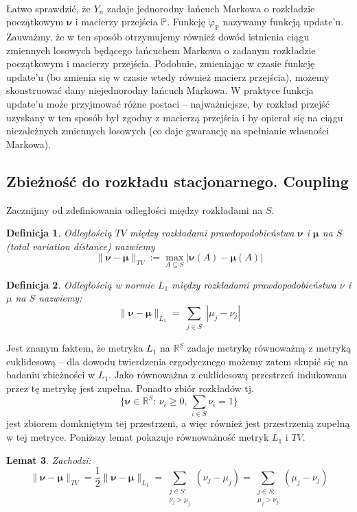 \documentclass[a4paper]{article}
\theoremstyle{defn}
\newtheorem{defn}{Definicja}[subsection]
\theoremstyle{theorem}
\theoremstyle{lemma}
\newtheorem{lemma}[defn]{Lemat}
\theoremstyle{cor}
\theoremstyle{fact}
\begin{document}
\\
Łatwo sprawdzić, że $Y_n$ zadaje jednorodny łańcuch Markowa o rozkładzie początkowym $\boldsymbol{\nu}$ i macierzy przejścia $\mathbb{P}$. Funkcję $\varphi_{\mathbb{P}}$ nazywamy funkcją update'u. Zauważmy, że w ten sposób otrzymujemy również dowód istnienia ciągu zmiennych losowych będącego łańcuchem Markowa o zadanym rozkładzie początkowym i macierzy przejścia.
Podobnie, zmieniając w czasie funkcję update'u (bo zmienia się w czasie wtedy również macierz przejścia), możemy skonstruować dany niejednorodny łańcuch Markowa. W praktyce funkcja update'u może przyjmować różne postaci – najważniejsze, by rozkład przejść uzyskany w ten sposób był zgodny z macierzą przejścia i by opierał się na ciągu niezależnych zmiennych losowych (co daje gwarancję na spełnianie własności Markowa).
\subsection{Zbieżność do rozkładu stacjonarnego. Coupling}
\label{sect2.4}
Zacznijmy od zdefiniowania odległości między rozkładami na $S$.
\begin{defn}\label{defn2.4.1}
Odległością $TV$ między rozkładami prawdopodobieństwa $\boldsymbol{\nu}$ i $\boldsymbol{\mu}$ na $S$ (\textit{total variation distance}) nazwiemy $$\|\boldsymbol{\nu} - \boldsymbol{\mu}\|_{TV} := \max\limits_{A \subseteq S} |\boldsymbol{\nu}(A) - \boldsymbol{\mu}(A)|$$
\end{defn}
\begin{defn}\label{defn2.4.2}
Odległością w normie $L_1$ między rozkładami prawdopodobieństwa $\nu$ i $\mu$ na $S$ nazwiemy:
$$\|\boldsymbol{\nu} - \boldsymbol{\mu}\|_{L_1} = \sum\limits_{\substack{j \in S}} |\mu_j - \nu_j|$$
\end{defn}
Jest znanym faktem, że metryka $L_1$ na $\mathbb{R}^S$ zadaje metrykę równoważną z metryką euklidesową – dla dowodu twierdzenia ergodycznego możemy zatem skupić się na badaniu zbieżności w $L_1$. Jako równoważna z euklidesową przestrzeń indukowana przez tę metrykę jest zupełna. Ponadto zbiór rozkładów tj.
$$\{\boldsymbol{\nu} \in \mathbb{R}^S:\, \nu_i \geq 0, \, \sum\limits_{i \in S} \nu_i = 1\}$$
jest zbiorem domkniętym tej przestrzeni, a więc również jest przestrzenią zupełną w tej metryce. Poniższy lemat pokazuje równoważność metryk $L_1$ i $TV$.
\begin{lemma}\label{lemma2.4.3}
Zachodzi:
$$\|\boldsymbol{\nu} - \boldsymbol{\mu}\|_{TV} = \frac{1}{2}\|\boldsymbol{\nu} - \boldsymbol{\mu}\|_{L_1} = \sum\limits_{\substack{j \in S:\\ \nu_j > \mu_j}} (\nu_j - \mu_j) = \sum\limits_{\substack{j \in S:\\ \mu_j > \nu_j}} (\mu_j - \nu_j)$$
\end{lemma}
\end{document}

